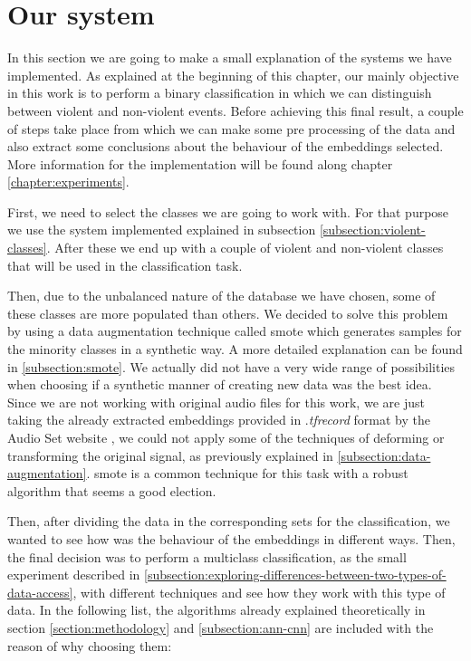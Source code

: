 \section{Our system}
\label{section:our-system}
	
	In this section we are going to make a small explanation of the systems we have implemented. As explained at the beginning of this chapter, our mainly objective in this work is to perform a binary classification in which we can distinguish between violent and non-violent events. Before achieving this final result, a couple of steps take place from which we can make some pre processing of the data and also extract some conclusions about the behaviour of the embeddings selected. More information for the implementation will be found along chapter \ref{chapter:experiments}.
	
	First, we need to select the classes we are going to work with. For that purpose we use the system implemented explained in subsection \ref{subsection:violent-classes}. After these we end up with a couple of violent and non-violent classes that will be used in the classification task.
	
	Then, due to the unbalanced nature of the database we have chosen, some of these classes are more populated than others. We decided to solve this problem by using a data augmentation technique called \acrshort{smote} which generates samples for the minority classes in a synthetic way. A more detailed explanation can be found in \ref{subsection:smote}. We actually did not have a very wide range of possibilities when choosing if a synthetic manner of creating new data was the best idea. Since we are not working with original audio files for this work, we are just taking the already extracted embeddings provided in .\textit{tfrecord} format by the Audio Set website \cite{SoundUnderstandinggroup2017}, we could not apply some of the techniques of deforming or transforming the original signal, as previously explained in \ref{subsection:data-augmentation}. \acrshort{smote} is a common technique for this task with a robust algorithm that seems a good election.
	
	Then, after dividing the data in the corresponding sets for the classification, we wanted to see how was the behaviour of the embeddings in different ways. Then, the final decision was to perform a multiclass classification, as the small experiment described in \ref{subsection:exploring-differences-between-two-types-of-data-access},  with different techniques and see how they work with this type of data. In the following list, the algorithms already explained theoretically in section \ref{section:methodology} and \ref{subsection:ann-cnn} are included with the reason of why choosing them:
	
